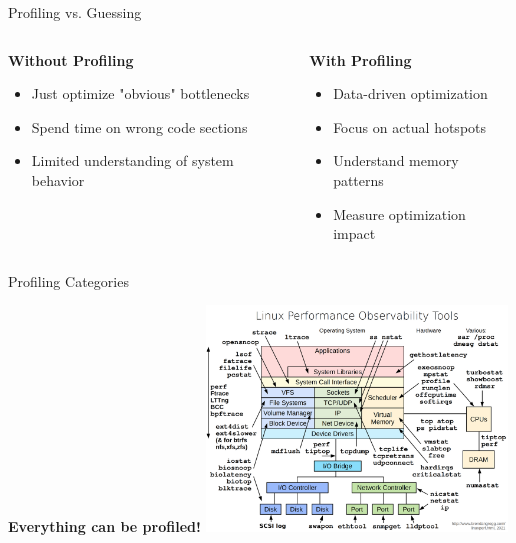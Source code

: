 \begin{frame}{Profiling vs. Guessing}
    \begin{columns}
        \begin{column}{0.5\textwidth}
            \textbf{Without Profiling}
            \begin{itemize}
                \item Just optimize "obvious" bottlenecks
                \item Spend time on wrong code sections
                \item Limited understanding of system behavior
            \end{itemize}
        \end{column}
        \begin{column}{0.5\textwidth}
            \textbf{With Profiling}
            \begin{itemize}
                \item Data-driven optimization
                \item Focus on actual hotspots
                \item Understand memory patterns
                \item Measure optimization impact
            \end{itemize}
        \end{column}
    \end{columns}
\end{frame}

\begin{frame}{Profiling Categories}
    \begin{center}
        \textbf{Everything can be profiled!}
        \vspace{0.5cm}
        \includegraphics[width=0.6\textwidth]{img/linux_observability_tools.png}
    \end{center}
\end{frame}

